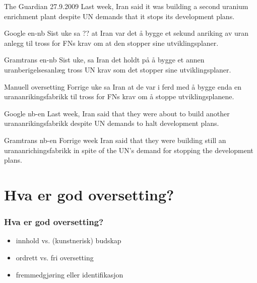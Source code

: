 \documentclass{beamer}
\begin{document}
\begin{frame} 

\begin{exampleblock}{The Guardian 27.9.2009}
Last week, Iran said it was building a second uranium enrichment plant despite UN demands that it stops its development plans.
\end{exampleblock} \pause

\begin{exampleblock}{Google en-nb}
Sist uke sa \alert{??} at Iran var det å bygge et \alert{sekund} \alert{anriking av uran anlegg} til tross for FNs krav om at den stopper sine utviklingsplaner.
\end{exampleblock} \pause

\begin{exampleblock}{Gramtrans en-nb}
Sist uke, sa Iran det holdt på å bygge et annen \alert{uranberigelsesanlæg} tross \alert{UN} krav \alert{som} det stopper sine utviklingsplaner.
\end{exampleblock}

\begin{exampleblock}{Manuell oversetting}
Forrige uke sa Iran at de var i ferd med å bygge enda en urananrikingsfabrikk til tross for FNs krav om å stoppe utviklingsplanene.
\end{exampleblock}

\end{frame}

\begin{frame}
\begin{exampleblock}{Google nb-en}
Last week, Iran said that they were about to build another \alert{urananrikingsfabrikk} despite UN demands to halt development plans.
\end{exampleblock}

\begin{exampleblock}{Gramtrans nb-en}
\alert{Forrige} week Iran said that they were building still an \alert{urananrichingsfabrikk} in spite of the UN's demand for stopping the development plans.
\end{exampleblock}

\end{frame}

\section{Hva er god oversetting?} 
\begin{frame}\frametitle{Hva er god oversetting?}
\begin{itemize}
\item innhold vs. (kunstnerisk) budskap
\item ordrett vs. fri oversetting 
\item fremmedgjøring eller identifikasjon 
\end{itemize} 
\end{frame}
\end{document}
